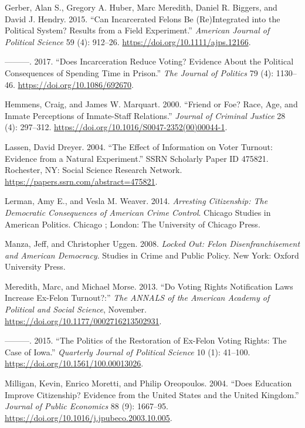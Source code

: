 \documentclass[
  12pt,
]{article}
\newlength{\cslhangindent}
\newenvironment{cslreferences}%
  {\setlength{\parindent}{0pt}%
  \everypar{\setlength{\hangindent}{\cslhangindent}}\ignorespaces}%
  {\par}
\begin{document}
\begin{cslreferences}
\leavevmode\hypertarget{ref-Gerber2015}{}%
Gerber, Alan S., Gregory A. Huber, Marc Meredith, Daniel R. Biggers, and David J. Hendry. 2015. ``Can Incarcerated Felons Be (Re)Integrated into the Political System? Results from a Field Experiment.'' \emph{American Journal of Political Science} 59 (4): 912--26. \url{https://doi.org/10.1111/ajps.12166}.

\leavevmode\hypertarget{ref-Gerber2017}{}%
---------. 2017. ``Does Incarceration Reduce Voting? Evidence About the Political Consequences of Spending Time in Prison.'' \emph{The Journal of Politics} 79 (4): 1130--46. \url{https://doi.org/10.1086/692670}.

\leavevmode\hypertarget{ref-Hemmens2000}{}%
Hemmens, Craig, and James W. Marquart. 2000. ``Friend or Foe? Race, Age, and Inmate Perceptions of Inmate-Staff Relations.'' \emph{Journal of Criminal Justice} 28 (4): 297--312. \url{https://doi.org/10.1016/S0047-2352(00)00044-1}.

\leavevmode\hypertarget{ref-Lassen2004}{}%
Lassen, David Dreyer. 2004. ``The Effect of Information on Voter Turnout: Evidence from a Natural Experiment.'' SSRN Scholarly Paper ID 475821. Rochester, NY: Social Science Research Network. \url{https://papers.ssrn.com/abstract=475821}.

\leavevmode\hypertarget{ref-Lerman2014}{}%
Lerman, Amy E., and Vesla M. Weaver. 2014. \emph{Arresting Citizenship: The Democratic Consequences of American Crime Control}. Chicago Studies in American Politics. Chicago ; London: The University of Chicago Press.

\leavevmode\hypertarget{ref-locked_out}{}%
Manza, Jeff, and Christopher Uggen. 2008. \emph{Locked Out: Felon Disenfranchisement and American Democracy}. Studies in Crime and Public Policy. New York: Oxford University Press.

\leavevmode\hypertarget{ref-Meredith2013}{}%
Meredith, Marc, and Michael Morse. 2013. ``Do Voting Rights Notification Laws Increase Ex-Felon Turnout?:'' \emph{The ANNALS of the American Academy of Political and Social Science}, November. \url{https://doi.org/10.1177/0002716213502931}.

\leavevmode\hypertarget{ref-Meredith2015}{}%
---------. 2015. ``The Politics of the Restoration of Ex-Felon Voting Rights: The Case of Iowa.'' \emph{Quarterly Journal of Political Science} 10 (1): 41--100. \url{https://doi.org/10.1561/100.00013026}.

\leavevmode\hypertarget{ref-Milligan2004}{}%
Milligan, Kevin, Enrico Moretti, and Philip Oreopoulos. 2004. ``Does Education Improve Citizenship? Evidence from the United States and the United Kingdom.'' \emph{Journal of Public Economics} 88 (9): 1667--95. \url{https://doi.org/10.1016/j.jpubeco.2003.10.005}.


\end{cslreferences}
\end{document}

